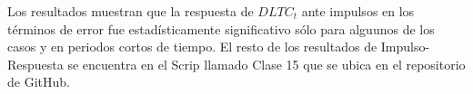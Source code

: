 \documentclass[
  a4paper,
]{article}
\begin{document}
Los resultados muestran que la respuesta de \(DLTC_t\) ante impulsos en
los términos de error fue estadísticamente significativo sólo para
alguunos de los casos y en periodos cortos de tiempo. El resto de los
resultados de Impulso-Respuesta se encuentra en el Scrip llamado Clase
15 que se ubica en el repositorio de GitHub.


\printbibliography
\end{document}
